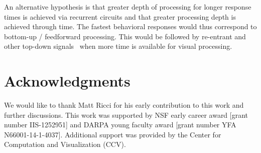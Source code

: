 \documentclass{article}
\begin{document}
An alternative hypothesis is that greater depth of processing for longer response times is achieved via recurrent circuits and that greater processing depth is achieved through time. The fastest behavioral responses would thus correspond to bottom-up / feedforward processing. This would be followed by re-entrant and other top-down signals~\citep{Gilbert2013} when more time is available for visual processing.






\section*{Acknowledgments}




We would like to thank Matt Ricci for his early contribution to this work and further discussions. This work was supported by NSF early career award [grant number IIS-1252951] and DARPA young faculty award [grant number YFA N66001-14-1-4037]. Additional support was provided by the Center for Computation and Visualization (CCV). 







\end{document}

